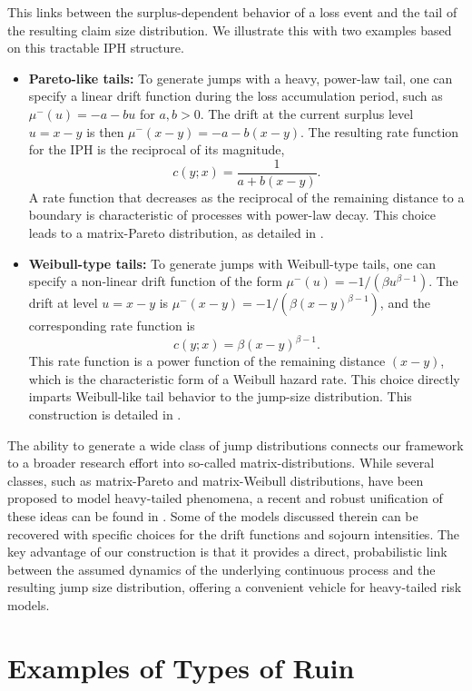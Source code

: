 \documentclass[11pt]{article}
\numberwithin{table}{section}
\numberwithin{figure}{section}
\numberwithin{equation}{section}
\newcommand{\1}{{\mathbf 1}}
\newcommand{\0}{\mat{0}}
\begin{document}
This links between the surplus-dependent behavior of a loss event and the tail of the resulting claim size distribution. We illustrate this with two examples based on this tractable IPH structure.
\begin{itemize}
    \item \textbf{Pareto-like tails:} To generate jumps with a heavy, power-law tail, one can specify a linear drift function during the loss accumulation period, such as $\mu^-(u) = -a - bu$ for $a,b>0$. The drift at the current surplus level $u=x-y$ is then $\mu^-(x-y) = -a -b(x-y)$. The resulting rate function for the IPH is the reciprocal of its magnitude,
    \[ c(y;x) = \frac{1}{a+b(x-y)}. \]
    A rate function that decreases as the reciprocal of the remaining distance to a boundary is characteristic of processes with power-law decay. This choice leads to a matrix-Pareto distribution, as detailed in \cite[Section 3]{albrecher2018ph}.

    \item \textbf{Weibull-type tails:} To generate jumps with Weibull-type tails, one can specify a non-linear drift function of the form $\mu^-(u) = -1/(\beta u^{\beta-1})$. The drift at level $u=x-y$ is $\mu^-(x-y)=-1/(\beta (x-y)^{\beta-1})$, and the corresponding rate function is
    \[ c(y;x) = \beta (x-y)^{\beta-1}. \]
    This rate function is a power function of the remaining distance $(x-y)$, which is the characteristic form of a Weibull hazard rate. This choice directly imparts Weibull-like tail behavior to the jump-size distribution. This construction is detailed in \cite[Section 4.1]{albrecher2018ph}.
\end{itemize}
The ability to generate a wide class of jump distributions connects our framework to a broader research effort into so-called matrix-distributions. While several classes, such as matrix-Pareto and matrix-Weibull distributions, have been proposed to model heavy-tailed phenomena, a recent and robust unification of these ideas can be found in \cite{bladt2022heavy}. Some of the models discussed therein can be recovered with specific choices for the drift functions and sojourn intensities. The key advantage of our construction is that it provides a direct, probabilistic link between the assumed dynamics of the underlying continuous process and the resulting jump size distribution, offering a convenient vehicle for heavy-tailed risk models.


\section{Examples of Types of Ruin}\label{sec:ruin-examples}
\end{document}
